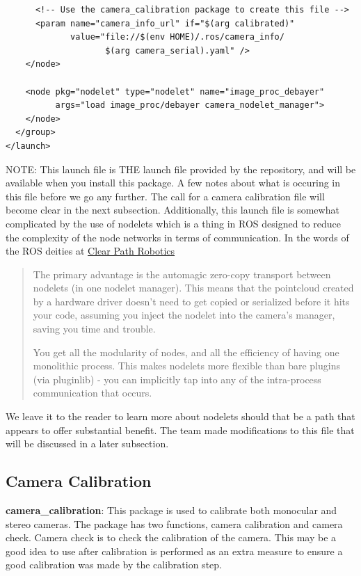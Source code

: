 \begin{itemize}
\begin{lstlisting}
      <!-- Use the camera_calibration package to create this file -->
      <param name="camera_info_url" if="$(arg calibrated)"
             value="file://$(env HOME)/.ros/camera_info/
                    $(arg camera_serial).yaml" />
    </node>

    <node pkg="nodelet" type="nodelet" name="image_proc_debayer"
          args="load image_proc/debayer camera_nodelet_manager">
    </node>
  </group>
</launch>
\end{lstlisting}
NOTE: This launch file is THE launch file provided by the repository, and will be available when you install this package. A few notes about what is occuring in this file before we go any further. The call for a camera calibration file will become clear in the next subsection. Additionally, this launch file is somewhat complicated by the use of nodelets which is a thing in ROS designed to reduce the complexity of the node networks in terms of communication. In the words of the ROS deities at \href{http://www.clearpathrobotics.com/guides/ros/Nodelet%20Everything.html}{Clear Path Robotics}
\begin{quotation}
The primary advantage is the automagic zero-copy transport between nodelets (in one nodelet manager). This means that the pointcloud created by a hardware driver doesn’t need to get copied or serialized before it hits your code, assuming you inject the nodelet into the camera’s manager, saving you time and trouble.

You get all the modularity of nodes, and all the efficiency of having one monolithic process. This makes nodelets more flexible than bare plugins (via pluginlib) - you can implicitly tap into any of the intra-process communication that occurs.
\end{quotation}
We leave it to the reader to learn more about nodelets should that be a path that appears to offer substantial benefit. The team made modifications to this file that will be discussed in a later subsection.
\end{itemize}

\subsection{Camera Calibration}
\noindent \textbf{camera\_calibration}: This package is used to calibrate both monocular and stereo cameras. The package has two functions, camera calibration and camera check. Camera check is to check the calibration of the camera. This may be a good idea to use after calibration is performed as an extra measure to ensure a good calibration was made by the calibration step. \par 

